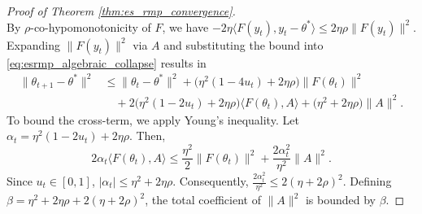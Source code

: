 \documentclass[letter,11pt]{article}
\begin{document}
\begin{proof}[Proof of Theorem \ref{thm:es_rmp_convergence}]
\begin{equation}
\end{equation}
By $\rho$-co-hypomonotonicity of $F$, we have $-2\eta \langle F(y_t), y_t - \theta^* \rangle \le 2\eta\rho \|F(y_t)\|^2$. Expanding $\|F(y_t)\|^2$ via $A$ and substituting the bound into \eqref{eq:esrmp_algebraic_collapse} results in
\begin{equation} \label{eq:esrmp_cohypo_applied}
\begin{aligned}
\|\theta_{t+1} - \theta^*\|^2 &\le \|\theta_t - \theta^*\|^2 + \big(\eta^2(1 - 4u_t) + 2\eta\rho\big)\|F(\theta_t)\|^2 \\
&\quad + 2\big(\eta^2(1 - 2u_t) + 2\eta\rho\big)\langle F(\theta_t), A \rangle + \big(\eta^2 + 2\eta\rho\big)\|A\|^2.
\end{aligned}
\end{equation}
To bound the cross-term, we apply Young's inequality. Let $\alpha_t = \eta^2(1 - 2u_t) + 2\eta\rho$. Then,
\begin{equation}
2\alpha_t \langle F(\theta_t), A \rangle \le \frac{\eta^2}{2} \|F(\theta_t)\|^2 + \frac{2\alpha_t^2}{\eta^2} \|A\|^2.
\end{equation}
Since $u_t \in [0, 1]$, $|\alpha_t| \le \eta^2 + 2\eta\rho$. Consequently, $\frac{2\alpha_t^2}{\eta^2} \le 2(\eta + 2\rho)^2$. Defining $\beta = \eta^2 + 2\eta\rho + 2(\eta + 2\rho)^2$, the total coefficient of $\|A\|^2$ is bounded by $\beta$.


\end{proof}
\end{document}
